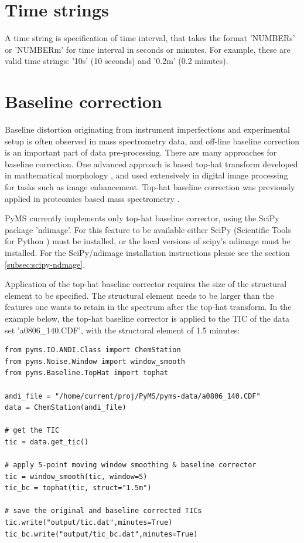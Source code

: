 \section{Time strings}
\label{sec:time-string}

A time string is specification of time interval, that takes the format
'NUMBERs' or 'NUMBERm' for time interval in seconds or minutes. For
example, these are valid time strings: '10s' (10 seconds) and '0.2m'
(0.2 minutes).

\section{\label{sec:baseline_correction}Baseline correction}


Baseline distortion originating from instrument imperfections and experimental
setup is often observed in mass spectrometry data, and off-line baseline correction
is an important part of data pre-processing. There are many approaches for
baseline correction. One advanced approach is based top-hat transform developed
in mathematical morphology \cite{serra83}, and used extensively in digital image
processing for tasks such as image enhancement.  Top-hat baseline correction was
previously applied in proteomics based mass spectrometry \cite{sauve04}.

PyMS currently implements only top-hat baseline corrector, using the SciPy
package 'ndimage'. For this feature to be available either SciPy (Scientific
Tools for Python \cite{scipy}) must be installed, or the local versions of
scipy's ndimage must be installed. For the SciPy/ndimage installation
instructions please see the section \ref{subsec:scipy-ndmage}.

Application of the top-hat baseline corrector requires the size of the structural
element to be specified. The structural element needs to be larger than the
features one wants to retain in the spectrum after the top-hat transform.
In the example below, the top-hat baseline corrector is applied to the TIC
of the data set 'a0806\_140.CDF', with the structural element of 1.5 minutes:

\begin{verbatim}
from pyms.IO.ANDI.Class import ChemStation
from pyms.Noise.Window import window_smooth
from pyms.Baseline.TopHat import tophat

andi_file = "/home/current/proj/PyMS/pyms-data/a0806_140.CDF"
data = ChemStation(andi_file)

# get the TIC
tic = data.get_tic()

# apply 5-point moving window smoothing & baseline corrector
tic = window_smooth(tic, window=5)
tic_bc = tophat(tic, struct="1.5m")

# save the original and baseline corrected TICs
tic.write("output/tic.dat",minutes=True)
tic_bc.write("output/tic_bc.dat",minutes=True)
\end{verbatim}

